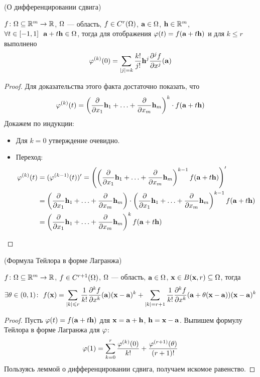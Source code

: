 \begin{lemma}(О дифференцировании сдвига)

    $f \colon \Omega \subseteq \mathbb{R}^m \to \mathbb{R}$, $\Omega$ --- область, $f \in C^r(\Omega)$, $\mathbf{a}
    \in \Omega$, $\mathbf{h} \in \mathbb{R}^m$, $\forall t \in [-1, 1]~~ \mathbf{a} + t\mathbf{h} \in \Omega$, тогда
    для отображения $\varphi(t) = f(\mathbf{a} + t\mathbf{h})$ и для $k \leqslant r$ выполнено
\[
    \varphi^{(k)}(0) = \sum_{|j| = k}{\frac{k!}{j!}\mathbf{h}^j \frac{\partial^j f}{\partial
    x^j}(\mathbf{a})}
\]
\end{lemma}
\begin{proof}
    Для доказательства этого факта достаточно показать, что
\[
    \varphi^{(k)}(t) = \left(\frac{\partial}{\partial x_1}\mathbf{h}_1 + \ldots +
    \frac{\partial}{\partial x_m}\mathbf{h}_m\right)^k \cdot f(\mathbf{a} + t\mathbf{h})
\]
    Докажем по индукции:
    \begin{itemize}
        \item Для $k = 0$ утверждение очевидно.
        \item Переход:
\begin{align*}
        \varphi^{(k)}(t) &= (\varphi^{(k - 1)}(t))' =
        \left(\left(\frac{\partial}{\partial x_1}\mathbf{h}_1 + \ldots +
        \frac{\partial}{\partial x_m}\mathbf{h}_m\right)^{k - 1} f(\mathbf{a} +
        t\mathbf{h})\right)' \\
        &= \left(\frac{\partial}{\partial x_1}\mathbf{h}_1 + \ldots +
        \frac{\partial}{\partial x_m}\mathbf{h}_m\right) \cdot
        \left(\frac{\partial}{\partial x_1}\mathbf{h}_1 + \ldots +
        \frac{\partial}{\partial x_m}\mathbf{h}_m\right)^{k - 1} f(\mathbf{a} +
        t\mathbf{h}) \\
        &= \left(\frac{\partial}{\partial x_1}\mathbf{h}_1 + \ldots +
        \frac{\partial}{\partial x_m}\mathbf{h}_m\right)^{k} f(\mathbf{a} +
        t\mathbf{h})
\end{align*}
    \end{itemize}
\end{proof}

\begin{theorem}(Формула Тейлора в форме Лагранжа)

    $f \colon \Omega \subseteq \mathbb{R}^m \to \mathbb{R}$, $f \in C^{r+1}(\Omega)$, $\Omega$ --- область,
    $\mathbf{a} \in \Omega$, $\mathbf{x} \in B(\mathbf{x}, r) \subseteq \Omega$, тогда
\[
    \exists \theta \in (0, 1)\colon~
    f(\mathbf{x}) = \sum_{|k| \leqslant r}{\frac{1}{k!}
    \frac{\partial^k f}{\partial x^k}(\mathbf{a}) (\mathbf{x} - \mathbf{a})^k}
    + \sum_{|k| = r+1}{\frac{1}{k!} \frac{\partial^k f}{\partial x^k}(\mathbf{a} +
    \theta(\mathbf{x} - \mathbf{a}))(\mathbf{x} - \mathbf{a})^k}
\]
\end{theorem}
\begin{proof}
    Пусть $\varphi(t) = f(\mathbf{a} + t\mathbf{h})$ для $\mathbf{x} = \mathbf{a} + \mathbf{h}$, $\mathbf{h} = \mathbf{x} - \mathbf{a}$.
    Выпишем формулу Тейлора в форме Лагранжа для $\varphi$:
\[
    \varphi(1) = \sum_{k = 0}^{r}{\frac{\varphi^{(k)}(0)}{k!}} +
    \frac{\varphi^{(r+1)}(\theta)}{(r+1)!}
\]
    Пользуясь леммой о дифференцировании сдвига, получаем искомое равенство.
\end{proof}

